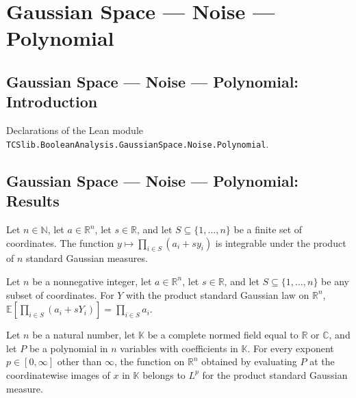 \section{Gaussian Space --- Noise --- Polynomial}
\subsection*{Gaussian Space --- Noise --- Polynomial: Introduction}

Declarations of the Lean module \texttt{TCSlib.BooleanAnalysis.GaussianSpace.Noise.Polynomial}.

\subsection*{Gaussian Space --- Noise --- Polynomial: Results}

\begin{lemma}
\label{BooleanAnalysis.GaussianSpace.integrable_gaussian_affine_monomial}
\leanok
{}
Let $n\in\mathbb N$, let $a\in\mathbb R^n$, let $s\in\mathbb R$, and let
$S\subseteq\{1,\ldots,n\}$ be a finite set of coordinates. The function
$y\mapsto\prod_{i\in S}(a_i+s y_i)$ is integrable under the product of $n$ standard
Gaussian measures.
\end{lemma}

\begin{lemma}
\label{BooleanAnalysis.GaussianSpace.integral_gaussian_affine_monomial}
\leanok
{}
Let $n$ be a nonnegative integer, let $a\in\mathbb R^n$, let $s\in\mathbb R$, and let
$S\subseteq\{1,\ldots,n\}$ be any subset of coordinates. For $Y$ with the product
standard Gaussian law on $\mathbb R^n$, $\mathbb E\left[\prod_{i\in
S}(a_i+sY_i)\right]=\prod_{i\in S}a_i$.
\end{lemma}

\begin{lemma}
\label{BooleanAnalysis.GaussianSpace.memLp_eval_gaussian}
\leanok
{}
Let $n$ be a natural number, let $\mathbb K$ be a complete normed field equal to
$\mathbb R$ or $\mathbb C$, and let $P$ be a polynomial in $n$ variables with
coefficients in $\mathbb K$. For every exponent $p\in[0,\infty]$ other than $\infty$,
the function on $\mathbb R^n$ obtained by evaluating $P$ at the coordinatewise images of
$x$ in $\mathbb K$ belongs to $L^p$ for the product standard Gaussian measure.
\end{lemma}

